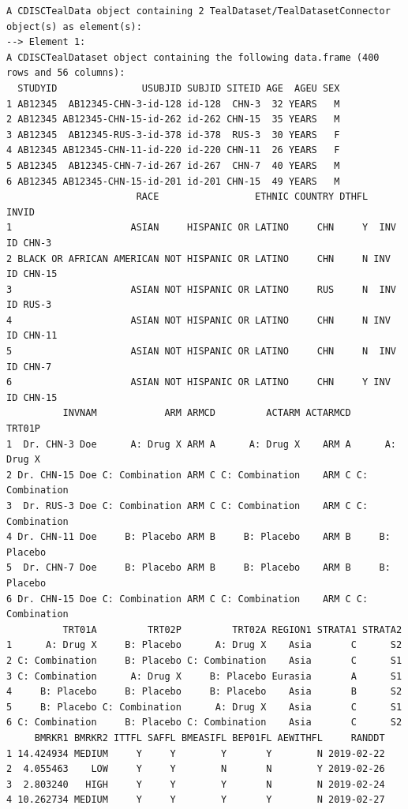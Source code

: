 \documentclass[
  letterpaper,
  DIV=11,
  numbers=noendperiod]{scrreprt}
\begin{document}
\begin{verbatim}
A CDISCTealData object containing 2 TealDataset/TealDatasetConnector object(s) as element(s):
--> Element 1:
A CDISCTealDataset object containing the following data.frame (400 rows and 56 columns):
  STUDYID               USUBJID SUBJID SITEID AGE  AGEU SEX
1 AB12345  AB12345-CHN-3-id-128 id-128  CHN-3  32 YEARS   M
2 AB12345 AB12345-CHN-15-id-262 id-262 CHN-15  35 YEARS   M
3 AB12345  AB12345-RUS-3-id-378 id-378  RUS-3  30 YEARS   F
4 AB12345 AB12345-CHN-11-id-220 id-220 CHN-11  26 YEARS   F
5 AB12345  AB12345-CHN-7-id-267 id-267  CHN-7  40 YEARS   M
6 AB12345 AB12345-CHN-15-id-201 id-201 CHN-15  49 YEARS   M
                       RACE                 ETHNIC COUNTRY DTHFL         INVID
1                     ASIAN     HISPANIC OR LATINO     CHN     Y  INV ID CHN-3
2 BLACK OR AFRICAN AMERICAN NOT HISPANIC OR LATINO     CHN     N INV ID CHN-15
3                     ASIAN NOT HISPANIC OR LATINO     RUS     N  INV ID RUS-3
4                     ASIAN NOT HISPANIC OR LATINO     CHN     N INV ID CHN-11
5                     ASIAN NOT HISPANIC OR LATINO     CHN     N  INV ID CHN-7
6                     ASIAN NOT HISPANIC OR LATINO     CHN     Y INV ID CHN-15
          INVNAM            ARM ARMCD         ACTARM ACTARMCD         TRT01P
1  Dr. CHN-3 Doe      A: Drug X ARM A      A: Drug X    ARM A      A: Drug X
2 Dr. CHN-15 Doe C: Combination ARM C C: Combination    ARM C C: Combination
3  Dr. RUS-3 Doe C: Combination ARM C C: Combination    ARM C C: Combination
4 Dr. CHN-11 Doe     B: Placebo ARM B     B: Placebo    ARM B     B: Placebo
5  Dr. CHN-7 Doe     B: Placebo ARM B     B: Placebo    ARM B     B: Placebo
6 Dr. CHN-15 Doe C: Combination ARM C C: Combination    ARM C C: Combination
          TRT01A         TRT02P         TRT02A REGION1 STRATA1 STRATA2
1      A: Drug X     B: Placebo      A: Drug X    Asia       C      S2
2 C: Combination     B: Placebo C: Combination    Asia       C      S1
3 C: Combination      A: Drug X     B: Placebo Eurasia       A      S1
4     B: Placebo     B: Placebo     B: Placebo    Asia       B      S2
5     B: Placebo C: Combination      A: Drug X    Asia       C      S1
6 C: Combination     B: Placebo C: Combination    Asia       C      S2
     BMRKR1 BMRKR2 ITTFL SAFFL BMEASIFL BEP01FL AEWITHFL     RANDDT
1 14.424934 MEDIUM     Y     Y        Y       Y        N 2019-02-22
2  4.055463    LOW     Y     Y        N       N        Y 2019-02-26
3  2.803240   HIGH     Y     Y        Y       N        N 2019-02-24
4 10.262734 MEDIUM     Y     Y        Y       Y        N 2019-02-27

\end{verbatim}
\end{document}
